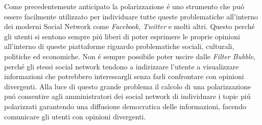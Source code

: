 Come precedentemente anticipato la polarizzazione \'e uno strumento che pu\'o essere facilmente utilizzato per individuare tutte queste problematiche all'interno dei moderni Social Network come \textit{Facebook}, \textit{Twitter } e molti altri. Questo perch\'e gli utenti si sentono sempre pi\'u liberi di poter esprimere le proprie opinioni all'interno di queste piattaforme riguardo problematiche sociali, culturali, politiche ed economiche.
Non \'e sempre possibile poter uscire dalle \textit{Filter Bubble}, perch\'e gli stessi social network tendono a indirizzare l'utente a visualizzare informazioni che potrebbero interessargli senza farli confrontare con opinioni divergenti. 
Alla luce di questo grande problema il calcolo di una polarizzazione pu\'o consentire agli amministratori dei social network di individuare i topic pi\'u polarizzati garantendo una diffusione democratica delle informazioni, facendo comunicare gli utenti con opinioni divergenti.

